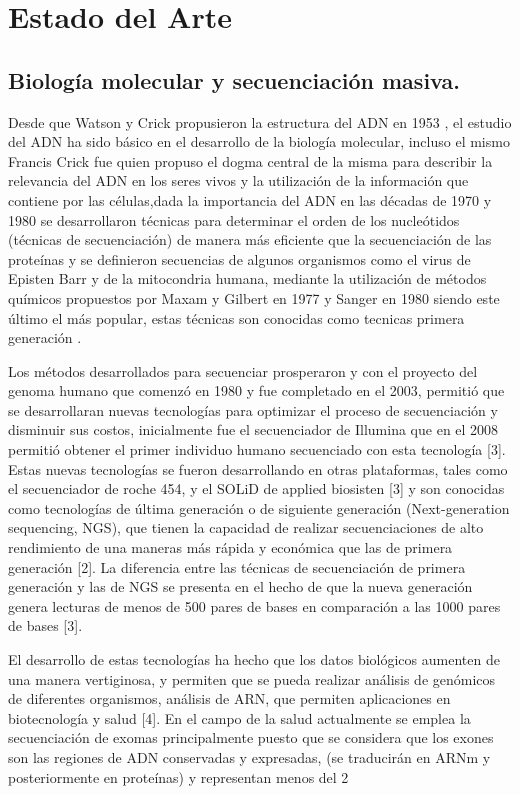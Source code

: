 \chapter{Estado del Arte}

\section{Biología molecular y secuenciación masiva.}

Desde  que  Watson y Crick propusieron la estructura del ADN en 1953 \cite{Watson1953}, el estudio del ADN ha sido básico en el desarrollo de la biología molecular, incluso el mismo Francis Crick fue quien propuso el dogma central de la misma para describir la relevancia del ADN en los seres vivos y la utilización de la información que contiene por las células,dada la importancia del  ADN  en las décadas de 1970 y 1980 se desarrollaron  técnicas para determinar el orden de los nucleótidos  (técnicas de secuenciación) de manera más eficiente que la secuenciación de las proteínas y se definieron secuencias de algunos organismos como el virus de Episten Barr y  de la mitocondria humana, mediante la utilización de métodos químicos propuestos por Maxam y Gilbert en 1977 y Sanger en 1980 siendo este último el más popular, estas técnicas son conocidas como tecnicas primera generación \cite{Herraez2012}. 

Los métodos desarrollados para secuenciar prosperaron y con el proyecto del genoma humano que comenzó en 1980 y fue completado en el 2003, permitió que se desarrollaran nuevas tecnologías para optimizar el proceso de secuenciación y disminuir sus costos, inicialmente fue el secuenciador de Illumina  que en el 2008 permitió obtener el primer individuo humano secuenciado con esta tecnología [3]. Estas nuevas tecnologías se fueron desarrollando en otras plataformas, tales como el secuenciador de roche 454, y el SOLiD de applied biosisten [3] y son conocidas como tecnologías de última generación o de siguiente generación (Next-generation sequencing, NGS), que tienen la capacidad de realizar secuenciaciones de alto rendimiento de una maneras más rápida y económica que las de primera generación [2]. La diferencia entre las técnicas de secuenciación de primera generación y las de NGS se presenta en el hecho de que la nueva generación genera lecturas de menos de 500 pares de bases en comparación a las 1000 pares de bases [3]. 

El desarrollo de estas tecnologías ha hecho que los datos biológicos aumenten de una manera vertiginosa, y permiten que se pueda realizar análisis de genómicos de diferentes organismos, análisis de ARN, que permiten aplicaciones en biotecnología y salud [4]. En el campo de la salud actualmente se emplea la secuenciación de exomas principalmente puesto que se considera que los exones son las regiones de ADN conservadas y expresadas, (se traducirán en ARNm y posteriormente en proteínas) y representan menos del 2%

